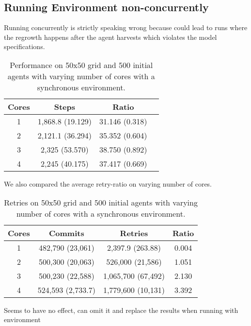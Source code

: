 \subsection{Running Environment non-concurrently}
Running concurrently is strictly speaking wrong because could lead to runs where the regrowth happens after the agent harvests which violates the model specifications. 

\begin{table}
	\centering
  	\begin{tabular}{ c || c | c | c }
        Cores & Steps            & Ratio           \\ \hline \hline 
    	1     & 1,868.8 (19.129) & 31.146 (0.318) \\ \hline
   		2     & 2,121.1 (36.294) & 35.352 (0.604) \\ \hline
   		3     & 2,325 (53.570)   & 38.750 (0.892) \\ \hline
   		4     & 2,245 (40.175)   & 37.417 (0.669) \\ \hline \hline
   	\end{tabular}
  	
  	\caption{Performance on 50x50 grid and 500 initial agents with varying number of cores with a synchronous environment.}
	\label{tab:naive_results_syncenv_time}
\end{table}

We also compared the average retry-ratio on varying number of cores.

\begin{table}
	\centering
  	\begin{tabular}{ c || c | c | c }
        Cores & Commits           & Retries            & Ratio \\ \hline \hline 
    	1     & 482,790 (23,061)  & 2,397.9 (263.88)   & 0.004 \\ \hline
   		2     & 500,300 (20,063)  & 526,000 (21,586)   & 1.051 \\ \hline
   		3     & 500,230 (22,588)  & 1,065,700 (67,492) & 2.130 \\ \hline
   		4     & 524,593 (2,733.7) & 1,779,600 (10,131) & 3.392 \\ \hline
   	\end{tabular}
  	
  	\caption{Retries on 50x50 grid and 500 initial agents with varying number of cores with a synchronous environment.}
	\label{tab:naive_results_syncenv_retries}
\end{table}

Seems to have no effect, can omit it and replace the results when running with environment 

